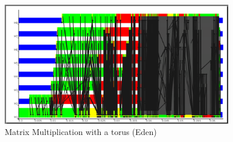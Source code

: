 \begin{figure}[ht]
	\centering
	\includegraphics[width=0.9\textwidth]{images/torus_matrix_eden_scale}
	\caption[Matrix Multiplication with a torus (Eden)]{Matrix Multiplication with a torus (Eden)}
	\label{fig:torus_eden_trace}
\end{figure}

